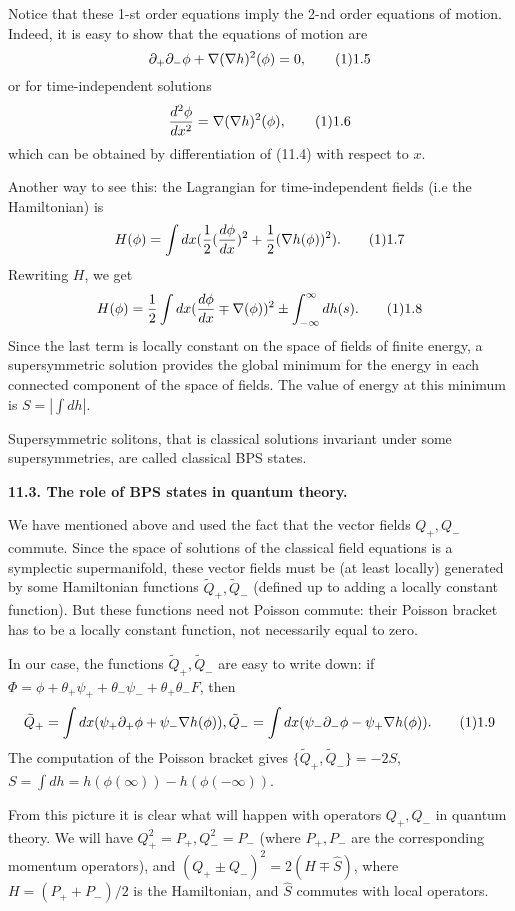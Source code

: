 Notice that these 1-st order equations imply the 2-nd order equations of
motion. Indeed, it is easy to show that the equations of motion are
$$
\d_+\d_-\phi+\nabla(\nabla h)^2(\phi)=0,\tag 11.5
$$
or for time-independent solutions
$$
\frac{d^2\phi}{d x^2}=\nabla(\nabla h)^2(\phi),\tag 11.6
$$
which can be obtained by differentiation of (11.4) with respect to $x$.

Another way to see this: the Lagrangian for time-independent
fields (i.e the Hamiltonian) is
$$
H(\phi)=\int dx(\frac{1}{2}(\frac{d\phi}{d x})^2+\frac{1}{2}(\nabla
h(\phi))^2)
.\tag 11.7
$$
Rewriting $H$, we get
$$
H(\phi)=\frac{1}{2}\int dx(\frac{d \phi}{d x}\mp \nabla(\phi))^2\pm
\int_{-\infty}^{\infty} dh(s).\tag 11.8
$$
Since the last term is locally constant on the space of fields of finite
energy, a supersymmetric solution provides the global minimum for the
energy in each connected component of the space of fields.
The value of energy at this minimum is $S=|\int dh|$.

 Supersymmetric solitons,
that is classical
solutions invariant under some supersymmetries, are called
classical BPS states.
\endproclaim

{\bf 11.3. The role of BPS states in quantum theory.}

We have mentioned above and used the fact that the vector fields
$Q_+,Q_-$ commute. Since the space of solutions of the classical
field equations is a symplectic supermanifold, these vector fields
must be (at least locally) generated by some Hamiltonian functions
 $\tilde Q_+,\tilde Q_-$ (defined up to adding a locally constant function).
But these functions need not Poisson commute: their Poisson bracket
has to be a locally constant function, not necessarily equal to zero.

In our case, the functions $\tilde Q_+,\tilde Q_-$ are easy to write down:
if $\Phi=\phi+\theta_+\psi_++\theta_-\psi_-+\theta_+\theta_-F$,
then
$$
\tilde Q_+=\int dx(\psi_+\d_+\phi+\psi_-\nabla h(\phi)),
\tilde Q_-=\int dx(\psi_-\d_-\phi-\psi_+\nabla h(\phi)).\tag 11.9
$$
The computation of the Poisson bracket gives $\{\tilde Q_+,\tilde Q_-\}=
-2S$, $S=\int dh=h(\phi(\infty))-h(\phi(-\infty))$.

 From this picture it is clear what will happen with operators
$Q_+,Q_-$ in quantum theory. We will have $Q_+^2=P_+,Q_-^2=P_-$
(where $P_+,P_-$ are the corresponding momentum operators),
and
$(Q_+\pm Q_-)^2=2(H\mp \hat S)$, where $H=(P_++P_-)/2$ is the Hamiltonian,
and $\hat S$ commutes with local operators.

